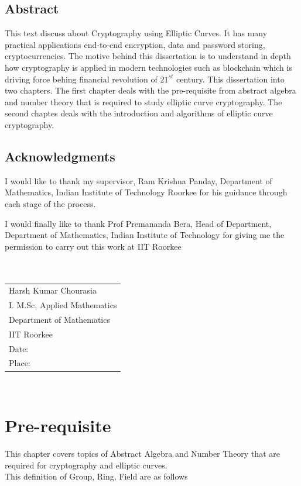 \documentclass[12pt,a4paper]{report}
\begin{document}
\section*{Abstract}
This text discuss about Cryptography using Elliptic Curves. It has many practical applications end-to-end encryption, data and password storing, cryptocurrencies. The motive behind this dissertation is to understand in depth how cryptography is applied in modern technologies such as blockchain which is driving force behing financial revolution of $21^{st}$ century. This dissertation into two chapters. The first chapter deals with the pre-requisite from abstract algebra and number theory that is required to study elliptic curve cryptography. The second chaptes deals with the introduction and algorithms of elliptic curve cryptography.
\cleardoublepage
\section*{Acknowledgments}
I would like to thank my supervisor, Ram Krishna Panday, Department
of Mathematics, Indian Institute of Technology Roorkee for his guidance through each stage of the process.

I would finally like to thank Prof Premananda Bera, Head of Department, Department of Mathematics, Indian Institute of Technology for giving me the permission to carry out this work at IIT Roorkee\\\\\\
\begin{tabular}{l}
Harsh Kumar Chourasia\\
I. M.Sc, Applied Mathematics\\
Department of Mathematics\\
IIT Roorkee\\
Date:\\
Place:\\ 
\end{tabular}
 
\cleardoublepage	
	
	
\tableofcontents
\thispagestyle{empty}
\cleardoublepage	
\
\setcounter{page}{1}
	
\chapter{Pre-requisite}
This chapter covers topics of Abstract Algebra and Number Theory that are required for cryptography and elliptic curves.\\
This definition of Group, Ring, Field are as follows
\end{document}
